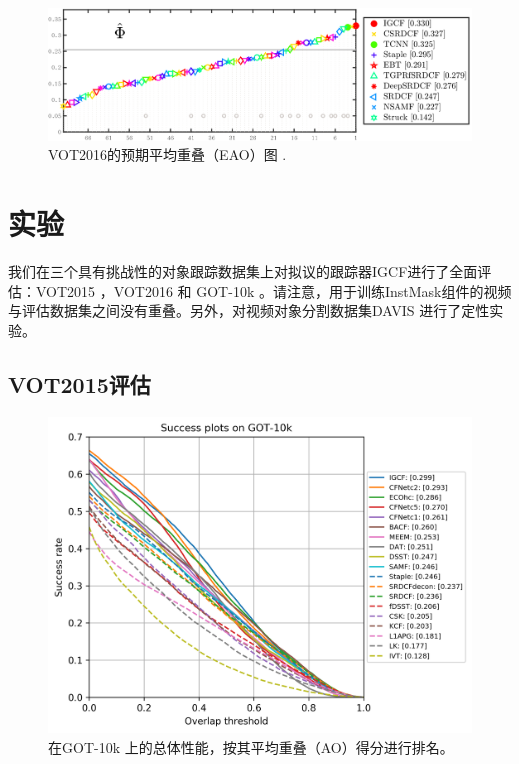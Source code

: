 \begin{figure}
    \centering
    \includegraphics[width=1.0\textwidth]{Img/IGCF/vot/eao_rank_vot2016.png}
    \caption{VOT2016的预期平均重叠（EAO）图 \cite{Kristan2016TheVO}.}
    \label{fig:vot16}
\end{figure}

\section{实验}
我们在三个具有挑战性的对象跟踪数据集上对拟议的跟踪器IGCF进行了全面评估：VOT2015 \cite{Kristan2015TheVO}，VOT2016 \cite{Kristan2016TheVO} 和 GOT-10k \cite{GOT-10k}。请注意，用于训练InstMask组件的视频与评估数据集之间没有重叠。另外，对视频对象分割数据集DAVIS \cite{Perazzi2016}进行了定性实验。
\subsection{VOT2015评估}

\begin{figure}
    \centering
    \includegraphics[width=1.0\textwidth]{Img/IGCF/got10k/success_plot.png}
    \caption{在GOT-10k \cite{GOT-10k}上的总体性能，按其平均重叠（AO）得分进行排名。}
    \label{fig:got10k}
\end{figure}

